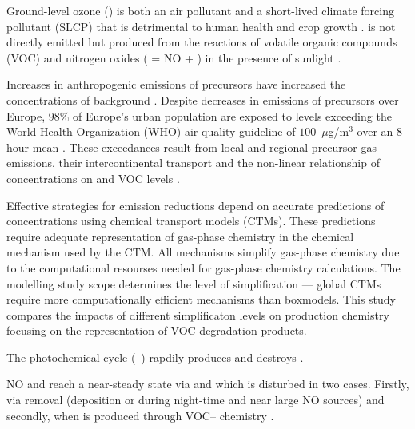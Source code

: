 Ground-level ozone () is both an air pollutant and a short-lived climate forcing pollutant (SLCP) that is detrimental to human health and crop growth \citep{AQEU:2014}. 
 is not directly emitted but produced from the reactions of volatile organic compounds (VOC) and nitrogen oxides ( = NO + ) in the presence of sunlight \citep{Atkinson:2000}.

Increases in anthropogenic emissions of  precursors have increased the concentrations of background  \citep{HTAP:2010}.
Despite decreases in emissions of  precursors over Europe, $98$\% of Europe's urban population are exposed to levels exceeding the World Health Organization (WHO) air quality guideline of \mbox{$100$ $\mu$g/m$^3$} over an \mbox{$8$-hour} mean \citep{WHO:2006}. 
These exceedances result from local and regional  precursor gas emissions, their intercontinental transport and the non-linear relationship of  concentrations on  and VOC levels \citep{AQEU:2014}.

Effective strategies for emission reductions depend on accurate predictions of  concentrations using chemical transport models (CTMs). 
These predictions require adequate representation of gas-phase chemistry in the chemical mechanism used by the CTM. 
All mechanisms simplify gas-phase chemistry due to the computational resourses needed for gas-phase chemistry calculations.
The modelling study scope determines the level of simplification --- global CTMs require more computationally efficient mechanisms than boxmodels.
This study compares the impacts of different simplificaton levels on  production chemistry focusing on the representation of VOC degradation products.

The photochemical cycle (--) rapdily produces and destroys . 
\begin{reactionlist}
\end{reactionlist}
NO and  reach a near-steady state via  and  which is disturbed in two cases. 
Firstly, via  removal (deposition or  during night-time and near large NO sources) and secondly, when  is produced through VOC-- chemistry \citep{Sillman:1999}.

